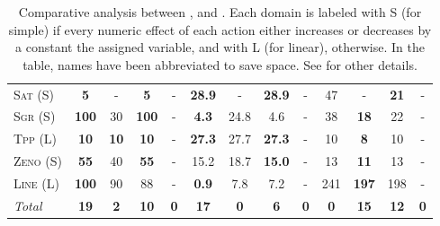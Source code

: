 \documentclass[11pt]{article}
\begin{document}
\begin{table*}[tb]
{\begin{tabular}{|l||cccc||cccc||cccc||}
\textsc{Sat} (S)&\textbf{5}&-&\textbf{5}&-&\textbf{28.9}&-&\textbf{28.9}&-&47&-&\textbf{21}&-\\
\textsc{Sgr} (S)&\textbf{100}&30&\textbf{100}&-&\textbf{4.3}&24.8&4.6&-&38&\textbf{18}&22&-\\
\textsc{Tpp} (L)&\textbf{10}&\textbf{10}&\textbf{10}&-&\textbf{27.3}&27.7&\textbf{27.3}&-&10&\textbf{8}&10&-\\
\textsc{Zeno} (S)&\textbf{55}&40&\textbf{55}&-&15.2&18.7&\textbf{15.0}&-&13&\textbf{11}&13&-\\
\textsc{Line} (L)&\textbf{100}&90&88&-&\textbf{0.9}&7.8&7.2&-&241&\textbf{197}&198&-
\\\hline
\textit{Total}&\textbf{19}&\textbf{2}&\textbf{10}&\textbf{0}&\textbf{17}&\textbf{0}&\textbf{6}&\textbf{0}&\textbf{0}&\textbf{15}&\textbf{12}&\textbf{0}\\\hline

        \end{tabular}}
        \caption{Comparative analysis between  \pattye, \pattym and \pattyi. Each domain is labeled with S (for simple) if every numeric effect of each action either increases or decreases by a constant the assigned variable, and with L (for linear), otherwise. In the table, names have been abbreviated to save space.  See \cite{ipc2023} for other details.}
        \label{tab:qual-plans}
        \end{table*}
        
\end{document}
